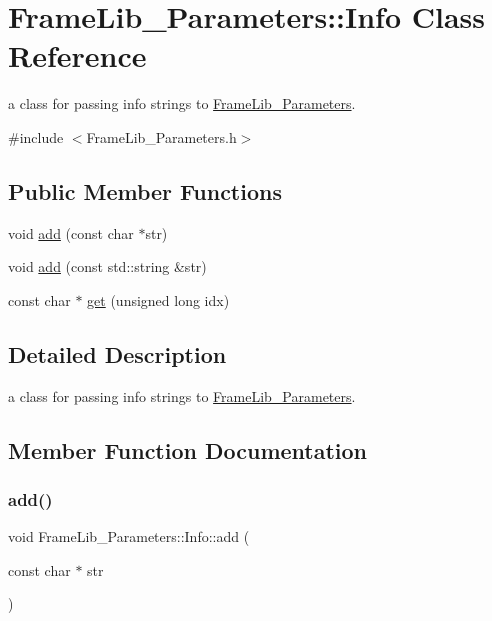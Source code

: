 \hypertarget{class_frame_lib___parameters_1_1_info}{}\section{Frame\+Lib\+\_\+\+Parameters\+:\+:Info Class Reference}
\label{class_frame_lib___parameters_1_1_info}


a class for passing info strings to \hyperlink{class_frame_lib___parameters}{Frame\+Lib\+\_\+\+Parameters}.  




{\ttfamily \#include $<$Frame\+Lib\+\_\+\+Parameters.\+h$>$}

\subsection*{Public Member Functions}
\begin{DoxyCompactItemize}
\item 
void \hyperlink{class_frame_lib___parameters_1_1_info_a7d2360d181ac4e0d8e49af6b5777b38b}{add} (const char $\ast$str)
\item 
void \hyperlink{class_frame_lib___parameters_1_1_info_ae5b7b0ee9401ba93b5a15cc25f0f7863}{add} (const std\+::string \&str)
\item 
const char $\ast$ \hyperlink{class_frame_lib___parameters_1_1_info_a1f1518215e8de95d2e587de919ff47f0}{get} (unsigned long idx)
\end{DoxyCompactItemize}


\subsection{Detailed Description}
a class for passing info strings to \hyperlink{class_frame_lib___parameters}{Frame\+Lib\+\_\+\+Parameters}. 

\subsection{Member Function Documentation}
\mbox{\label{class_frame_lib___parameters_1_1_info_a7d2360d181ac4e0d8e49af6b5777b38b}} 
\subsubsection{\texorpdfstring{add()}{add()}\hspace{0.1cm}{\footnotesize\ttfamily [1/2]}}
{\footnotesize\ttfamily void Frame\+Lib\+\_\+\+Parameters\+::\+Info\+::add (\begin{DoxyParamCaption}\item[{const char $\ast$}]{str }\end{DoxyParamCaption})\hspace{0.3cm}{\ttfamily [inline]}}

